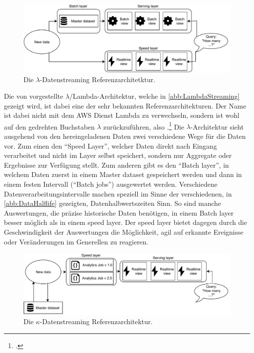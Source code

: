 \begin{figure}[H]
\centering
\includegraphics[width=\textwidth]{graphics/Lambda-Reference-Architecture.pdf}
\caption[Die $\lambda$-Datenstreaming Referenzarchitetktur]{Die $\lambda$-Datenstreaming Referenzarchitetktur.\footnotemark}
\label{abb:LambdaStreaming}
\end{figure}

Die von \citeauthor{Marz.2015} vorgestellte $\lambda$/Lambda-Architektur, welche in \autoref{abb:LambdaStreaming} gezeigt wird, ist dabei eine der sehr bekannten Referenzarchitekturen. 
Der Name ist dabei nicht mit dem \ac{AWS} Dienst Lambda zu verwechseln, sondern ist wohl auf den gedrehten Buchstaben $\lambda$ zurückzuführen, also .\footcite[Vgl. auch im Folgenden][]{Berle.27.11.2017} Die $\lambda$-Architektur sieht ausgehend von den hereingeladenen Daten zwei verschiedene Wege für die Daten vor. 
Zum einen den \enquote{Speed Layer}, welcher Daten direkt nach Eingang verarbeitet und nicht im Layer selbst speichert, sondern nur Aggregate oder Ergebnisse zur Verfügung stellt. Zum anderen gibt es den \enquote{Batch layer}, in welchem Daten zuerst in einem Master dataset gespeichert werden und dann in einem festen Intervall (\enquote{Batch jobs}) ausgewertet werden. 
Verschiedene Datenverarbeitungsintervalle machen speziell im Sinne der verschiedenen, in \autoref{abb:DataHalflife} gezeigten, Datenhalbwertszeiten Sinn. So sind manche Auswertungen, die präzise historische Daten benötigen, in einem Batch layer besser möglich als in einem speed layer. Der speed layer bietet dagegen durch die Geschwindigkeit der Auswertungen die Möglichkeit, agil auf erkannte Ereignisse oder Veränderungen im Generellen zu reagieren.


\begin{figure}[H]
\centering
\includegraphics[width=\textwidth]{graphics/Kappa-Reference-Architecture.pdf}
\caption[Die $\kappa$-Datenstreaming Referenzarchitetktur]{Die $\kappa$-Datenstreaming Referenzarchitektur.\footnotemark}
\label{abb:KappaStreaming}
\end{figure}

